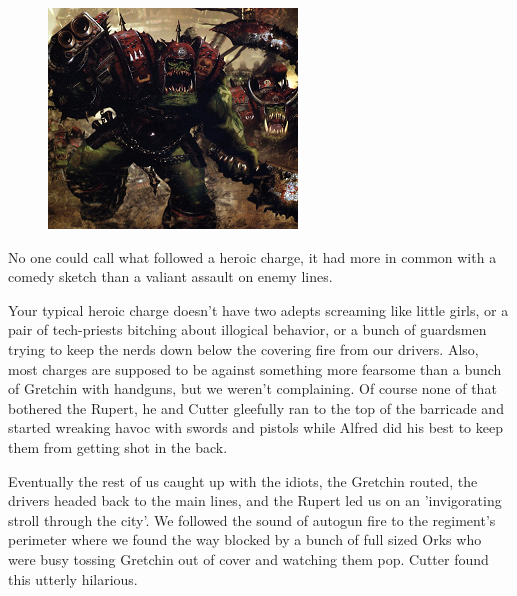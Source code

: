 \begin{figure}
	\begin{center}
		\includegraphics[width=\figwidth]{pics/4/16.png}
	\end{center}
\end{figure}
No one could call what followed a heroic charge, it had more in common with a comedy sketch than a valiant assault on enemy lines. 

Your typical heroic charge doesn't have two adepts screaming like little girls, or a pair of tech-priests bitching about illogical behavior, or a bunch of guardsmen trying to keep the nerds down below the covering fire from our drivers. 
Also, most charges are supposed to be against something more fearsome than a bunch of Gretchin with handguns, but we weren't complaining. 
Of course none of that bothered the Rupert, he and Cutter gleefully ran to the top of the barricade and started wreaking havoc with swords and pistols while Alfred did his best to keep them from getting shot in the back. 

Eventually the rest of us caught up with the idiots, the Gretchin routed, the drivers headed back to the main lines, and the Rupert led us on an 'invigorating stroll through the city'. 
We followed the sound of autogun fire to the regiment's perimeter where we found the way blocked by a bunch of full sized Orks who were busy tossing Gretchin out of cover and watching them pop. 
Cutter found this utterly hilarious.

